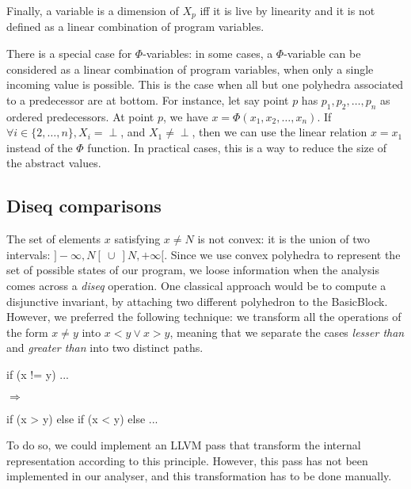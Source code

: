 \documentclass[a4paper,english,titlepage,11pt]{report}
\begin{document}
	Finally, a variable is a dimension of $X_p$ iff it is live by linearity and
	it is not defined as a linear combination of program variables.


	There is a special case for $\Phi$-variables: in some cases, a
	$\Phi$-variable can be considered as a linear combination of program
	variables, when only a single incoming value is possible. This is the case
	when all but one polyhedra associated to a predecessor are at bottom.
	For instance, let say point $p$ has $p_1, p_2, \dots, p_n$ as ordered 
	predecessors. At point $p$, we have $x = \Phi(x_1, x_2,\dots,x_n)$.
	If $\forall i \in \{2,\dots,n\}, X_i = \perp$, and $X_1 \neq \perp$, then we
	can use the linear relation $x = x_1$ instead of the $\Phi$ function. In
	practical cases, this is a way to reduce the size of the abstract values.


\subsection{Diseq comparisons}

The set of elements $x$ satisfying $x \neq N$ is not convex: it is the union of
two intervals: $]-\infty, N[\  \cup\  ]N,+\infty[$. Since we use convex polyhedra to
represent the set of possible states of our program, we loose information when
the analysis comes across a \emph{diseq} operation.
One classical approach would be to compute a disjunctive invariant, by attaching
two different polyhedron to the BasicBlock. However, we preferred the following
technique: we transform all the operations of the form $x \neq y$ into
$x < y \vee x > y$, meaning that we separate the cases \emph{lesser than} and
\emph{greater than} into two distinct paths.

\begin{minipage}[c]{.29\linewidth}
\begin{C}
if (x != y) {
	...
}
\end{C}
\end{minipage} $\Rightarrow$
\begin{minipage}[c]{.69\linewidth}
\centering
\begin{C}
	if (x > y) {
	} else if (x < y) {
	} else {
		...
	}
\end{C}
\end{minipage}

To do so, we could implement an LLVM pass that transform the internal
representation according to this principle. However, this pass has not been
implemented in our analyser, and this transformation has to be done manually.
\end{document}
